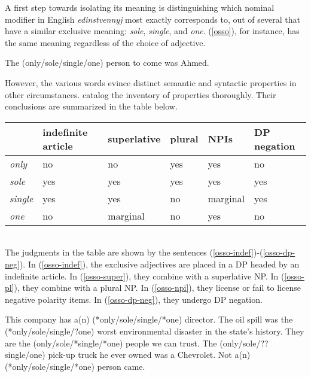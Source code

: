 \documentclass{article}
\begin{document}
A first step towards isolating its meaning is distinguishing which nominal modifier in English \textit{edinstvennyj} most exactly corresponds to, out of several that have a similar exclusive meaning: \textit{sole}, \textit{single}, and \textit{one}. (\ref{osso}), for instance, has the same meaning regardless of the choice of adjective.

\begin{exe}
	\ex \label{osso} The (only/sole/single/one) person to come was Ahmed.
\end{exe}

However, the various words evince distinct semantic and syntactic properties in other circumstances. \citet{cb2012b} catalog the inventory of properties thoroughly. Their conclusions are summarized in the table below.\\

\begin{tabular}{ l | l l l l l }
	& indefinite article & superlative & plural & NPIs & DP negation \\
	\hline
	\textit{only} & no & no & yes & yes & no \\
	\textit{sole} & yes & yes & yes & yes & yes \\
	\textit{single} & yes & yes & no & marginal & yes \\
	\textit{one} & no & marginal & no & yes & no \\
\end{tabular}

\ \\

The judgments in the table are shown by the sentences (\ref{osso-indef})-(\ref{osso-dp-neg}). In (\ref{osso-indef}), the exclusive adjectives are placed in a DP headed by an indefinite article. In (\ref{osso-super}), they combine with a superlative NP. In (\ref{osso-pl}), they combine with a plural NP. In (\ref{osso-npi}), they license or fail to license negative polarity items. In (\ref{osso-dp-neg}), they undergo DP negation.

\begin{exe}
	\ex \label{osso-indef} This company has a(n) (*only/sole/single/*one) director.
	\ex \label{osso-super} The oil spill was the (*only/sole/single/?one) worst environmental disaster in the state's history.
	\ex \label{osso-pl} They are the (only/sole/*single/*one) people we can trust.
	\ex \label{osso-npi} The (only/sole/??single/one) pick-up truck he ever owned was a Chevrolet.
	\ex \label{osso-dp-neg} Not a(n) (*only/sole/single/*one) person came.
\end{exe}
\end{document}
